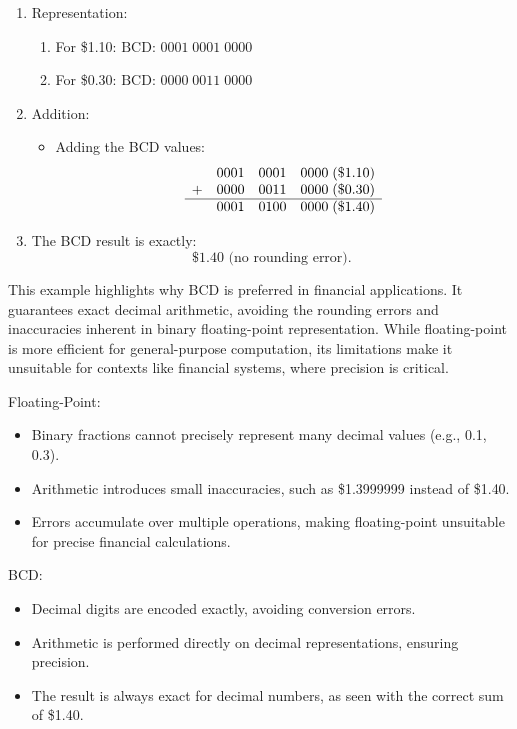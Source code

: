 \begin{enumerate}
    \item Representation:
    \begin{enumerate}
        \item For \$1.10:
     \(
     \text{BCD: } 0001 \; 0001 \; 0000
     \)

        \item For \$0.30:
     \(
     \text{BCD: } 0000 \; 0011 \; 0000
     \)
    \end{enumerate}

    \item Addition:
    \begin{itemize}
        \item Adding the BCD values:
   \[
   \begin{array}{cccc}
     & 0001 & 0001 & 0000 \; (\$1.10) \\
   + & 0000 & 0011 & 0000 \; (\$0.30) \\
   \hline
     & 0001 & 0100 & 0000 \; (\$1.40)
   \end{array}
   \]
    \end{itemize}

   \item The BCD result is exactly:
   \[
   \text{\$1.40 (no rounding error)}.
   \]

\end{enumerate}

This example highlights why BCD is preferred in financial applications. It guarantees exact decimal arithmetic, avoiding the rounding errors and inaccuracies inherent in binary floating-point representation. While floating-point is more efficient for general-purpose computation, its limitations make it unsuitable for contexts like financial systems, where precision is critical.

Floating-Point:
    \begin{itemize}
        \item Binary fractions cannot precisely represent many decimal values (e.g., 0.1, 0.3).
        \item Arithmetic introduces small inaccuracies, such as \$1.3999999 instead of \$1.40.
        \item Errors accumulate over multiple operations, making floating-point unsuitable for precise financial calculations.
    \end{itemize}
    
BCD:
    \begin{itemize}
        \item Decimal digits are encoded exactly, avoiding conversion errors.
        \item Arithmetic is performed directly on decimal representations, ensuring precision.
        \item The result is always exact for decimal numbers, as seen with the correct sum of \$1.40.
    \end{itemize}



